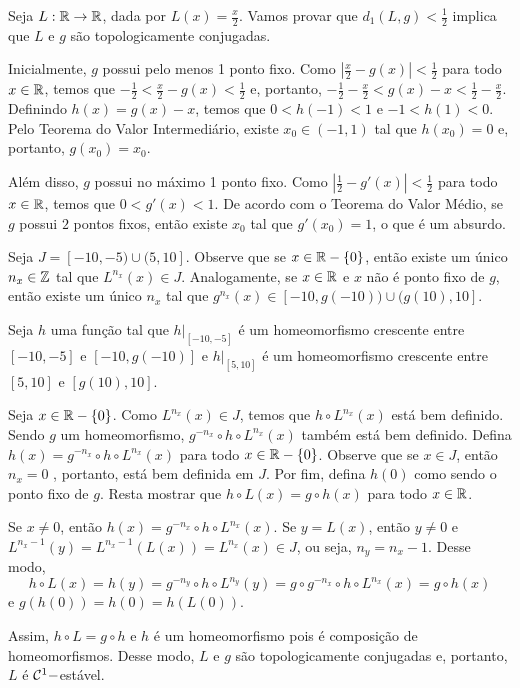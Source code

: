 \begin{example}
Seja $L: \mathbb{R} \to \mathbb{R}$, dada por $L(x) = \frac{x}{2}$. Vamos provar que $d_1(L, g) < \frac{1}{2}$ implica que $L$ e $g$ são topologicamente conjugadas.

Inicialmente, $g$ possui pelo menos 1 ponto fixo. Como $\left| \frac{x}{2} - g(x) \right| < \frac{1}{2}$ para todo $x \in \mathbb{R}$, temos que $-\frac{1}{2} < \frac{x}{2} - g(x) < \frac{1}{2}$ e, portanto, $-\frac{1}{2} - \frac{x}{2} < g(x) - x < \frac{1}{2} - \frac{x}{2}$. Definindo $h(x) = g(x) - x$, temos que $0 < h(-1) < 1$ e $-1 < h(1) < 0$. Pelo Teorema do Valor Intermediário, existe $x_0 \in (-1, 1)$ tal que $h(x_0) = 0$ e, portanto, $g(x_0) = x_0$.

Além disso, $g$ possui no máximo 1 ponto fixo. Como $\left| \frac{1}{2} - g'(x) \right| < \frac{1}{2}$ para todo $x \in \mathbb{R}$, temos que $0 < g'(x) < 1$. De acordo com o Teorema do Valor Médio, se $g$ possui $2$ pontos fixos, então existe $x_0$ tal que $g'(x_0) = 1$, o que é um absurdo.

Seja $J = [-10, -5) \cup (5, 10]$. Observe que se $x \in \mathbb{R} - \{0\}$, então existe um único $n_x \in \mathbb{Z}$ tal que $L^{n_x}(x) \in J$. Analogamente, se $x \in \mathbb{R}$ e $x$ não é ponto fixo de $g$, então existe um único $n_x$ tal que $g^{n_x}(x) \in [-10, g(-10)) \cup (g(10), 10]$.

Seja $h$ uma função tal que $h|_{[-10, -5]}$ é um homeomorfismo crescente entre $[-10, -5]$ e $[-10, g(-10)]$ e $h|_{[5, 10]}$ é um homeomorfismo crescente entre $[5, 10]$ e $[g(10), 10]$.

Seja $x \in \mathbb{R} - \{0\}$. Como $L^{n_x}(x) \in J$, temos que $h \circ L^{n_x}(x)$ está bem definido. Sendo $g$ um homeomorfismo, $g^{-n_x} \circ h \circ L^{n_x}(x)$ também está bem definido. Defina $h(x) = g^{-n_x} \circ h \circ L^{n_x}(x)$ para todo $x \in \mathbb{R} - \{0\}$. Observe que se $x \in J$, então $n_x = 0$ , portanto, está bem definida em $J$. Por fim, defina $h(0)$ como sendo o ponto fixo de $g$. Resta mostrar que $h \circ L(x) = g \circ h(x)$ para todo $x \in \mathbb{R}$.

Se $x \neq 0$, então $h(x) = g^{-n_x} \circ h \circ L^{n_x}(x)$. Se $y = L(x)$, então $y \neq 0$ e $L^{n_x - 1}(y) = L^{n_x - 1}(L(x)) = L^{n_x}(x) \in J$, ou seja, $n_y = n_x - 1$. Desse modo,
$$h \circ L(x) = h(y) = g^{-n_y} \circ h \circ L^{n_y}(y) = g \circ g^{-n_x} \circ h \circ L^{n_x}(x) = g \circ h(x)$$
e $g(h(0)) = h(0) = h(L(0))$.

Assim, $h \circ L = g \circ h$ e $h$ é um homeomorfismo pois é composição de homeomorfismos. Desse modo, $L$ e $g$ são topologicamente conjugadas e, portanto, $L$ é $\mathcal{C}^1-$estável.
\end{example}


